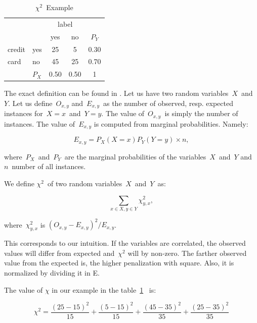 \begin{table}[h!]
 \center
 \begin{tabular}{|l|l|c|c|c}
 \cline{3-4}
        &       & \multicolumn{2}{c|}{label} & \\
        \cline{3-4}
        &       & yes        & no            & $P_Y$ \\
        \cline{1-4}
 credit & yes   & 25         & 5             & 0.30 \\
        \cline{2-4}
 card   & no    & 45         & 25            & 0.70 \\
        \cline{1-4}
        & $P_X$ & 0.50       & 0.50          & 1
 
 \end{tabular}
 \caption{$\chi^2$~Example}
 \label{tab:chi_ex}
\end{table}

The exact definition can be found in \citet{Hugh13}.
Let us have two random variables~$X$~and~$Y$.
Let us define~$O_{x,y}$ and~$E_{x,y}$~as the number of observed,
resp. expected instances for~$X=x$~and~$Y=y$.
The value of~$O_{x,y}$~is simply the number of instances.
The value of~$E_{x,y}$ is computed from marginal probabilities.
Namely:

\begin{equation}
E_{x,y} = P_X\left(X=x\right) P_Y\left(Y=y\right) \times n,
\end{equation}

where~$P_X$~and~$P_Y$~are the marginal probabilities of the variables~$X$~and~$Y$
and~$n$~number of all instances.

We define $\chi^2$~of two random variables~$X$~and~$Y$~as:

$$\sum_{x \in X, y \in Y}{\chi^2_{y,x}},$$

where~${\chi^2_{y,x}}$ is $\left(O_{x,y} - E_{x,y} \right)^ 2 / E_{x,y}$.

This corresponds to our intuition.
If the variables are correlated,
the observed values will differ from expected and~$\chi^2$ will by non-zero.
The farther observed value from the expected is, the higher penalization with square.
Also, it is normalized by dividing it in E.

The value of $\chi$ in our example in the table~\ref{tab:chi_ex}
~is:

\begin{equation}
\chi^2 = 
\frac{\left(25-15\right)^2}{15} +
\frac{\left(5-15\right)^2}{15} +
\frac{\left(45-35\right)^2}{35} +
\frac{\left(25-35\right)^2}{35}
\end{equation}

